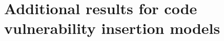 \documentclass[11pt]{article}
\newcommand\todo[1]{\textcolor{badred}{#1}}
\begin{document}



\FloatBarrier








\FloatBarrier
\section{Additional results for code vulnerability insertion models}\label{app:vuln-iid}
\end{document}
